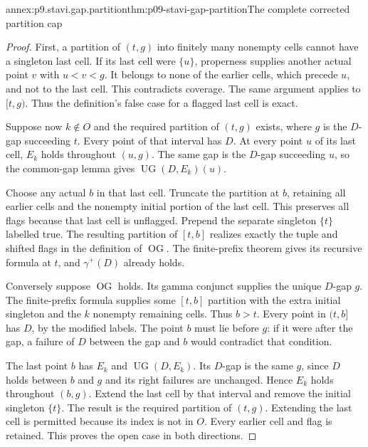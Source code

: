 \begin{annexitem}{annex:p9.stavi.gap.partition}{thm:p09-stavi-gap-partition}{The complete corrected partition cap}
\begin{proof}
First, a partition of \((t,g)\)
into finitely many nonempty cells
cannot have a singleton last cell.
If its last cell were \(\{u\}\),
properness supplies another actual
point \(v\) with \(u<v<g\).
It belongs to none of the
earlier cells, which precede
\(u\), and not to the
last cell. This contradicts
coverage. The same argument
applies to \([t,g)\).
Thus the definition's false
case for a flagged last
cell is exact.

Suppose now \(k\notin O\)
and the required partition
of \((t,g)\) exists,
where \(g\) is the
\(D\)-gap succeeding \(t\).
Every point of that
interval has \(D\).
At every point \(u\)
of its last cell,
\(E_k\) holds throughout
\((u,g)\). The same
gap is the \(D\)-gap
succeeding \(u\),
so the common-gap
lemma gives
\(\operatorname{UG}(D,E_k)(u)\).

Choose any actual
\(b\) in that last
cell. Truncate the
partition at \(b\),
retaining all earlier
cells and the
nonempty initial
portion of the
last cell.
This preserves all
flags because that
last cell is
unflagged. Prepend
the separate
singleton \(\{t\}\)
labelled true.
The resulting
partition of
\([t,b]\)
realizes exactly
the tuple and
shifted flags
in the definition
of \(\operatorname{OG}\).
The finite-prefix
theorem gives
its recursive
formula at \(t\),
and \(\gamma^+(D)\)
already holds.

Conversely suppose
\(\operatorname{OG}\)
holds. Its gamma
conjunct supplies
the unique
\(D\)-gap \(g\).
The finite-prefix
formula supplies
some \([t,b]\)
partition with
the extra initial
singleton and
the \(k\)
nonempty remaining
cells. Thus
\(b>t\).
Every point in
\((t,b]\)
has \(D\),
by the modified
labels.
The point \(b\)
must lie before
\(g\): if it
were after the
gap, a failure
of \(D\) between
the gap and
\(b\) would
contradict that
condition.

The last point
\(b\) has
\(E_k\) and
\(\operatorname{UG}(D,E_k)\).
Its \(D\)-gap
is the same
\(g\), since
\(D\) holds
between \(b\)
and \(g\)
and its
right failures
are unchanged.
Hence \(E_k\)
holds throughout
\((b,g)\).
Extend the
last cell
by that
interval and
remove the
initial singleton
\(\{t\}\).
The result
is the required
partition of
\((t,g)\).
Extending the
last cell is
permitted because
its index is
not in \(O\).
Every earlier
cell and flag
is retained.
This proves
the open case
in both
directions.


\end{proof}
\end{annexitem}
